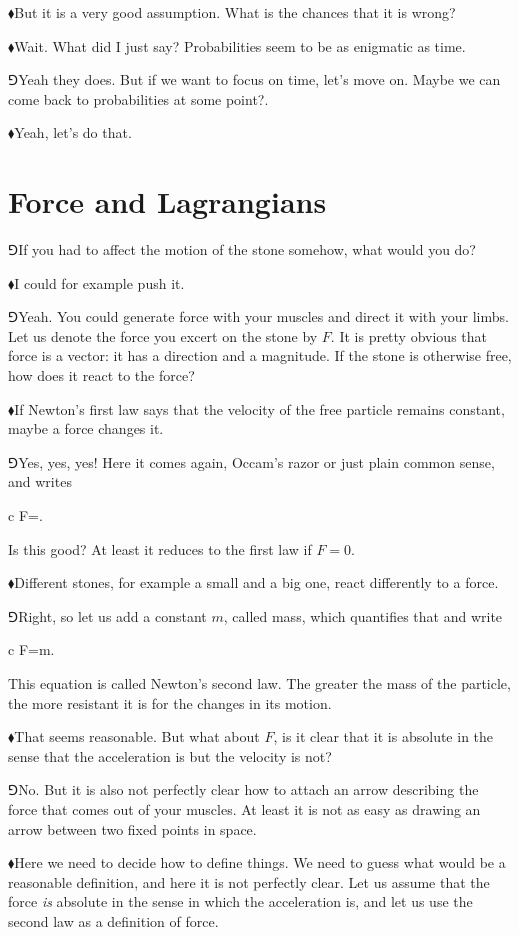 \documentclass[10pt,oneside%
]{memoir}
\newenvironment{eqna}{\begin{IEEEeqnarray*}{c}}{\end{IEEEeqnarray*}\ignorespacesafterend}
\newcommand{\hea}{\(\blacklozenge\)\;}
\newcommand{\heb}{\(\Game\)\;}
\begin{document}
\hea But it is a very good assumption. What is the chances that it is wrong?

\hea Wait. What did I just say? Probabilities seem to be as enigmatic as time.

\heb Yeah they does. But if we want to focus on time, let's move on. Maybe we can come back to probabilities at some point?.

\hea Yeah, let's do that.
\section{Force and Lagrangians}
\heb If you had to affect the motion of the stone somehow, what would you do?

\hea I could for example push it.

\heb Yeah. You could generate force with your muscles and direct it with your limbs. Let us denote the force you excert on the stone by \(F\). It is pretty obvious that force is a vector: it has a direction and a magnitude. If the stone is otherwise free, how does it react to the force?

\hea If Newton's first law says that the velocity of the free particle remains constant, maybe a force changes it.

\heb Yes, yes, yes! Here it comes again, Occam's razor or just plain common sense, and writes
\begin{eqna}
    F=.
\end{eqna}
Is this good? At least it reduces to the first law if \(F=0\).

\hea Different stones, for example a small and a big one, react differently to a force.

\heb Right, so let us add a constant \(m\), called mass, which quantifies that and write
\begin{eqna}
    F=m.
\end{eqna}
This equation is called Newton's second law. The greater the mass of the particle, the more resistant it is for the changes in its motion.

\hea That seems reasonable. But what about \(F\), is it clear that it is absolute in the sense that the acceleration is but the velocity is not?

\heb No. But it is also not perfectly clear how to attach an arrow describing the force that comes out of your muscles. At least it is not as easy as drawing an arrow between two fixed points in space.

\hea Here we need to decide how to define things. We need to guess what would be a reasonable definition, and here it is not perfectly clear. Let us assume that the force \emph{is} absolute in the sense in which the acceleration is, and let us use the second law as a definition of force.
\end{document}
